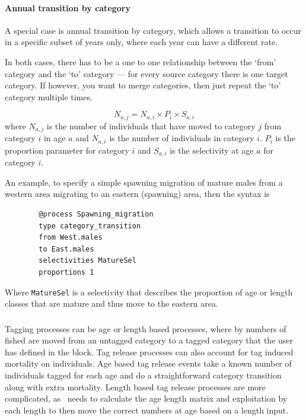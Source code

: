 \paragraph{Annual transition by category}

A special case is annual transition by category, which allows a transition to occur in a specific subset of years only, where each year can have a different rate.

In both cases, there has to be a one to one relationship between the `from' category and the `to' category --- for every source category there is one target category. If however, you want to merge categories, then just repeat the `to' category multiple times. 

\begin{equation}
	N_{a,j} = N_{a,i} \times P_i \times S_{a,i}
\end{equation}
where $N_{a,j}$ is the number of individuals that have moved to category $j$ from category $i$ in age $a$ and $N_{a,i}$ is the number of individuals in category $i$. $P_i$ is the proportion parameter for category $i$ and $S_{a,i}$ is the selectivity at age $a$ for category $i$.

An example, to specify a simple spawning migration of mature males from a western area migrating to an eastern (spawning) area, then the syntax is
{\small{\begin{verbatim}
		@process Spawning_migration
		type category_transition 
		from West.males	
		to East.males	
		selectivities MatureSel
		proportions 1
		\end{verbatim}}}

Where \texttt{MatureSel} is a selectivity that describes the proportion of age or length classes that are mature and thus move to the eastern area.

\subsubsection{}

Tagging processes can be age or length based processes, where by numbers of fished are moved from an untagged category to a tagged category that the user has defined in the  block. Tag release processes can also account for tag induced mortality on individuals. Age based tag release events take a known number of individuals tagged for each age and do a straightforward category transition along with extra mortality. Length based tag release processes are more complicated, as \CNAME\ needs to calculate the age length matrix and exploitation by each length to then move the correct numbers at age based on a length input. 

